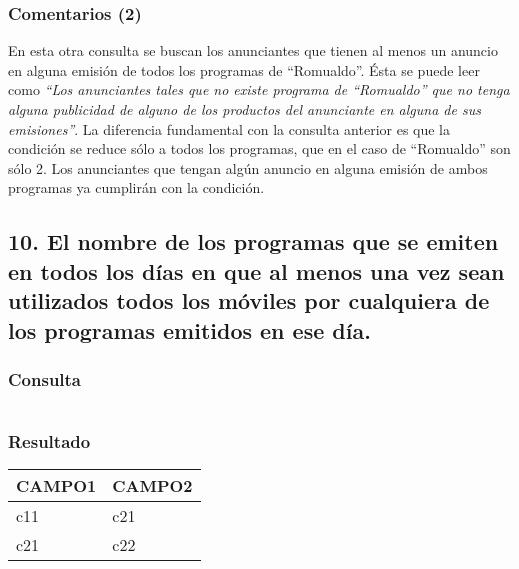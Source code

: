 \subsubsection*{Comentarios (2)}
En esta otra consulta se buscan los anunciantes que tienen al menos un anuncio en alguna emisión de todos los programas de ``Romualdo''. Ésta se puede leer como \textit{``Los anunciantes tales que no existe programa de ``Romualdo'' que no tenga alguna publicidad de alguno de los productos del anunciante en alguna de sus emisiones''}. La diferencia fundamental con la consulta anterior es que la condición se reduce sólo a todos los programas, que en el caso de ``Romualdo'' son sólo 2. Los anunciantes que tengan algún anuncio en alguna emisión de ambos programas ya cumplirán con la condición. \\

\subsection*{10. \normalsize{El nombre de los programas que se emiten en todos los d\'ias en que al menos una vez sean utilizados todos los m\'oviles por cualquiera de los programas emitidos en ese d\'ia.}}

\subsubsection*{Consulta}
\begin{lstlisting} 

\end{lstlisting}

\subsubsection*{Resultado}
\begin{tabular}{|l|l|}
  \hline
    \bf{CAMPO1} & \bf{CAMPO2} \\ 
  \hline
    c11 & c21 \\ 
    c21 & c22 \\
  \hline
\end{tabular} 
